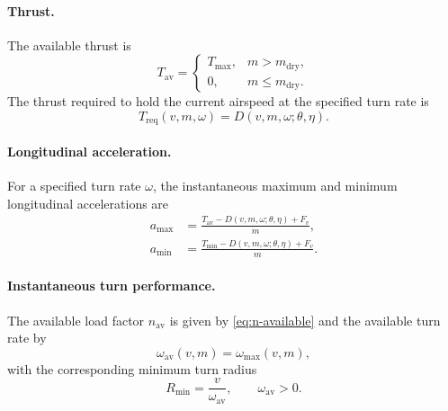 \documentclass[11pt,a4paper]{article}
\newcommand{\vectheta}{\theta}
\newcommand{\veceta}{\eta}
\begin{document}
\paragraph{Thrust.}
The available thrust is
\begin{equation}
  T_{\mathrm{av}} =
  \begin{cases}
    T_{\max}, & m > m_{\mathrm{dry}}, \\
    0, & m \le m_{\mathrm{dry}} .
  \end{cases}
\end{equation}
The thrust required to hold the current airspeed at the specified turn rate is
\begin{equation}
  T_{\mathrm{req}}(v, m, \omega) = D(v, m, \omega; \vectheta, \veceta).
  \label{eq:t-req}
\end{equation}

\paragraph{Longitudinal acceleration.}
For a specified turn rate $\omega$, the instantaneous maximum and minimum
longitudinal accelerations are
\begin{align}
  a_{\max} &= \frac{T_{\mathrm{av}} - D(v, m, \omega; \vectheta, \veceta) + F_v}{m}, \\
  a_{\min} &= \frac{T_{\min} - D(v, m, \omega; \vectheta, \veceta) + F_v}{m}.
\end{align}

\paragraph{Instantaneous turn performance.}
The available load factor $n_{\mathrm{av}}$ is given by \cref{eq:n-available} and
the available turn rate by
\begin{equation}
  \omega_{\mathrm{av}}(v, m) = \omega_{\max}(v, m),
\end{equation}
with the corresponding minimum turn radius
\begin{equation}
  R_{\min} = \frac{v}{\omega_{\mathrm{av}}}, \qquad \omega_{\mathrm{av}} > 0 .
\end{equation}
\end{document}
